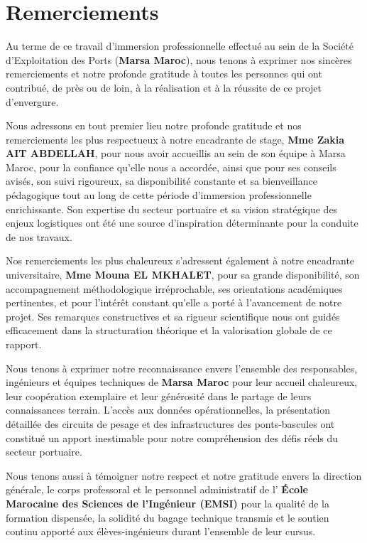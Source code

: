\documentclass[12pt,a4paper,oneside]{report}
\newcommand{\blankpage}{%
  \newpage
  \thispagestyle{empty}%
  \mbox{}%
  \newpage
}
\begin{document}
\blankpage

\chapter*{Remerciements}

Au terme de ce travail d'immersion professionnelle effectué au sein de la Société d'Exploitation des Ports (\textbf{Marsa Maroc}), nous tenons à exprimer nos sincères remerciements et notre profonde gratitude à toutes les personnes qui ont contribué, de près ou de loin, à la réalisation et à la réussite de ce projet d'envergure.

Nous adressons en tout premier lieu notre profonde gratitude et nos remerciements les plus respectueux à notre encadrante de stage, \textbf{Mme Zakia AIT ABDELLAH}, pour nous avoir accueillis au sein de son équipe à Marsa Maroc, pour la confiance qu'elle nous a accordée, ainsi que pour ses conseils avisés, son suivi rigoureux, sa disponibilité constante et sa bienveillance pédagogique tout au long de cette période d'immersion professionnelle enrichissante. Son expertise du secteur portuaire et sa vision stratégique des enjeux logistiques ont été une source d'inspiration déterminante pour la conduite de nos travaux.

Nos remerciements les plus chaleureux s'adressent également à notre encadrante universitaire, \textbf{Mme Mouna EL MKHALET}, pour sa grande disponibilité, son accompagnement méthodologique irréprochable, ses orientations académiques pertinentes, et pour l'intérêt constant qu'elle a porté à l'avancement de notre projet. Ses remarques constructives et sa rigueur scientifique nous ont guidés efficacement dans la structuration théorique et la valorisation globale de ce rapport.

Nous tenons à exprimer notre reconnaissance envers l'ensemble des responsables, ingénieurs et équipes techniques de \textbf{Marsa Maroc} pour leur accueil chaleureux, leur coopération exemplaire et leur générosité dans le partage de leurs connaissances terrain. L'accès aux données opérationnelles, la présentation détaillée des circuits de pesage et des infrastructures des ponts-bascules ont constitué un apport inestimable pour notre compréhension des défis réels du secteur portuaire.

Nous tenons aussi à témoigner notre respect et notre gratitude envers la direction générale, le corps professoral et le personnel administratif de l' \textbf{École Marocaine des Sciences de l'Ingénieur (EMSI)} pour la qualité de la formation dispensée, la solidité du bagage technique transmis et le soutien continu apporté aux élèves-ingénieurs durant l'ensemble de leur cursus.
\end{document}
